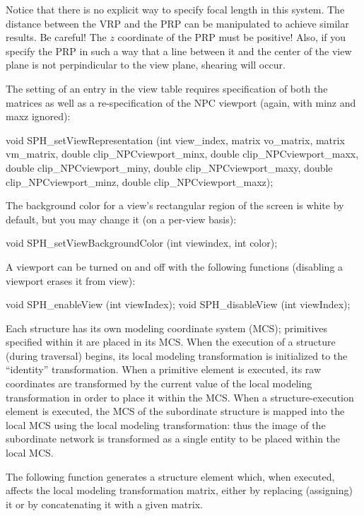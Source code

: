 \newpar
Notice that there is no explicit way to specify focal length in this system.
The distance between the VRP and the PRP can be manipulated to achieve similar
results.  Be careful!  The $z$ coordinate of the PRP must be positive!  Also,
if you specify the PRP in such a way that a line between it and the center of
the view plane is not perpindicular to the view plane, shearing will occur.

\newpar
The setting of an entry in the view table requires specification of both the
matrices as well as a re-specification of the NPC viewport (again, with minz
and maxz ignored):

\begincode
void
SPH_setViewRepresentation
   (int view_index, 
    matrix vo_matrix, matrix vm_matrix,
    double clip_NPCviewport_minx, double clip_NPCviewport_maxx, 
    double clip_NPCviewport_miny, double clip_NPCviewport_maxy,
    double clip_NPCviewport_minz, double clip_NPCviewport_maxz);
\endcode

\newpar
The background color for a view's rectangular region of the screen is white by
default, but you may change it (on a per-view basis):

\begincode
void SPH_setViewBackgroundColor (int viewindex, int color);
\endcode

\newpar
A viewport can be turned on and off with the following
functions (disabling a viewport erases it from view):

\begincode
void SPH_enableView (int viewIndex);
void SPH_disableView (int viewIndex);
\endcode


Each structure has its own modeling coordinate system (MCS); primitives
specified within it are placed in its MCS.  When the execution of a structure
(during traversal) begins, its local modeling transformation is initialized to
the ``identity'' transformation.  When a primitive element is executed, its raw
coordinates are transformed by the current value of the local modeling
transformation in order to place it within the MCS.  When a structure-execution
element is executed, the MCS of the subordinate structure is mapped into the
local MCS using the local modeling transformation: thus the image of the
subordinate network is transformed as a single entity to be placed within the
local MCS.

\newpar
The following function generates a structure element which, when executed,
affects the local modeling transformation matrix, either by replacing
(assigning) it or by concatenating it with a given matrix.

